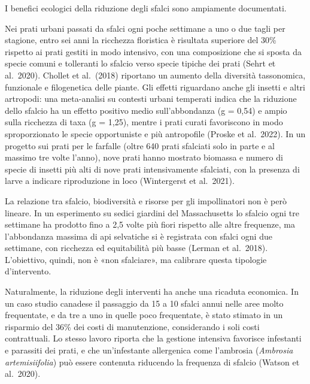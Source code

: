 \documentclass[
  a4paper,
]{book}
\begin{document}
I benefici ecologici della riduzione degli sfalci sono ampiamente documentati.

Nei prati urbani passati da sfalci ogni poche settimane a uno o due tagli per stagione, entro sei anni la ricchezza floristica è risultata superiore del 30\% rispetto ai prati gestiti in modo intensivo, con una composizione che si sposta da specie comuni e tolleranti lo sfalcio verso specie tipiche dei prati (Sehrt et al.~2020). Chollet et al.~(2018) riportano un aumento della diversità tassonomica, funzionale e filogenetica delle piante. Gli effetti riguardano anche gli insetti e altri artropodi: una meta-analisi su contesti urbani temperati indica che la riduzione dello sfalcio ha un effetto positivo medio sull'abbondanza (g = 0,54) e ampio sulla ricchezza di taxa (g = 1,25), mentre i prati curati favoriscono in modo sproporzionato le specie opportuniste e più antropofile (Proske et al.~2022). In un progetto sui prati per le farfalle (oltre 640 prati sfalciati solo in parte e al massimo tre volte l'anno), nove prati hanno mostrato biomassa e numero di specie di insetti più alti di nove prati intensivamente sfalciati, con la presenza di larve a indicare riproduzione in loco (Wintergerst et al.~2021).

La relazione tra sfalcio, biodiversità e risorse per gli impollinatori non è però lineare. In un esperimento su sedici giardini del Massachusetts lo sfalcio ogni tre settimane ha prodotto fino a 2,5 volte più fiori rispetto alle altre frequenze, ma l'abbondanza massima di api selvatiche si è registrata con sfalci ogni due settimane, con ricchezza ed equitabilità più basse (Lerman et al.~2018). L'obiettivo, quindi, non è «non sfalciare», ma calibrare questa tipologie d'intervento.

Naturalmente, la riduzione degli interventi ha anche una ricaduta economica. In un caso studio canadese il passaggio da 15 a 10 sfalci annui nelle aree molto frequentate, e da tre a uno in quelle poco frequentate, è stato stimato in un risparmio del 36\% dei costi di manutenzione, considerando i soli costi contrattuali. Lo stesso lavoro riporta che la gestione intensiva favorisce infestanti e parassiti dei prati, e che un'infestante allergenica come l'ambrosia (\emph{Ambrosia artemisiifolia}) può essere contenuta riducendo la frequenza di sfalcio (Watson et al.~2020).
\end{document}
